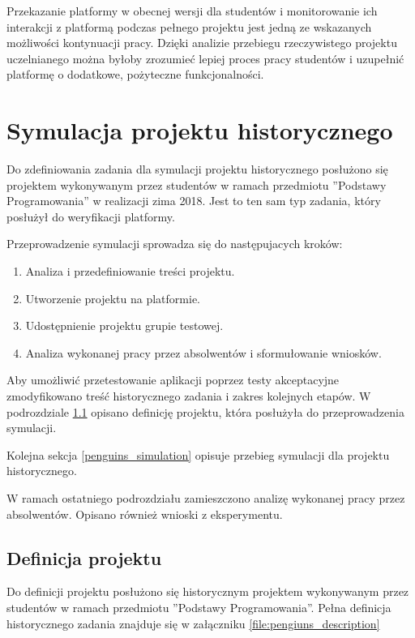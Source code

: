 Przekazanie platformy w obecnej wersji dla studentów i monitorowanie ich interakcji z platformą podczas pełnego projektu jest jedną ze wskazanych możliwości kontynuacji pracy.
Dzięki analizie przebiegu rzeczywistego projektu uczelnianego można byłoby zrozumieć lepiej proces pracy studentów i uzupełnić platformę o dodatkowe, pożyteczne funkcjonalności.


\section{Symulacja projektu historycznego}
\label{research_penguins}

Do zdefiniowania zadania dla symulacji projektu historycznego posłużono się projektem wykonywanym przez studentów w ramach przedmiotu ”Podstawy Programowania” w realizacji zima 2018.
Jest to ten sam typ zadania, który posłużył do weryfikacji platformy.

Przeprowadzenie symulacji sprowadza się do następujacych kroków:
\begin{enumerate}
    \item Analiza i przedefiniowanie treści projektu.
    \item Utworzenie projektu na platformie.
    \item Udostępnienie projektu grupie testowej.
    \item Analiza wykonanej pracy przez absolwentów i sformułowanie wniosków.
\end{enumerate}

Aby umożliwić przetestowanie aplikacji poprzez testy akceptacyjne zmodyfikowano treść historycznego zadania i zakres kolejnych etapów.
W podrozdziale \ref{penguins_project_definition} opisano definicję projektu, która posłużyła do przeprowadzenia symulacji.

Kolejna sekcja \ref{penguins_simulation} opisuje przebieg symulacji dla projektu historycznego.

W ramach ostatniego podrozdziału zamieszczono analizę wykonanej pracy przez absolwentów.
Opisano również wnioski z eksperymentu.


\subsection{Definicja projektu}
\label{penguins_project_definition}

Do definicji projektu posłużono się historycznym projektem wykonywanym przez studentów w ramach przedmiotu ”Podstawy Programowania”.
Pełna definicja historycznego zadania znajduje się w załączniku \ref{file:pengiuns_description}


